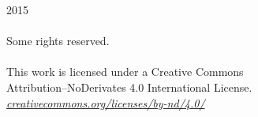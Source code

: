 \begin{vplace}[5]
\begin{center}
2015\\
\MakeUppercase{\AuthorName}\\
Some rights reserved.\\
\ccbynd \\ %
This work is licensed under a Creative Commons\\
Attribution--NoDerivates 4.0 International License.\\
\href{https://creativecommons.org/licenses/by-nd/4.0/}{\em creativecommons.org/licenses/by-nd/4.0/}
\end{center}
\end{vplace}
